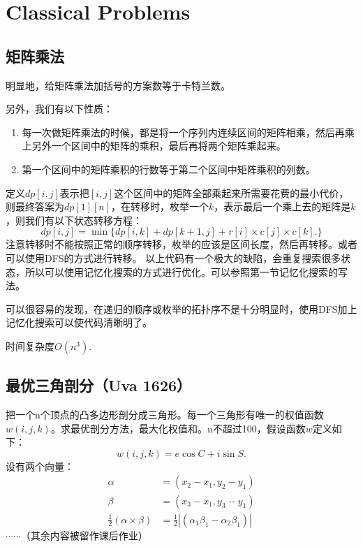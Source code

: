 \documentclass{article}
\begin{document}
\section{Classical Problems}
\subsection{矩阵乘法}
明显地，给矩阵乘法加括号的方案数等于卡特兰数。

另外，我们有以下性质：
\begin{enumerate}
    \item{每一次做矩阵乘法的时候，都是将一个序列内连续区间的矩阵相乘，然后再乘上另外一个区间中的矩阵的乘积，最后再将两个矩阵乘起来。}
    \item{第一个区间中的矩阵乘积的行数等于第二个区间中矩阵乘积的列数。}
\end{enumerate}

定义$dp[i,j]$表示把$[i,j]$这个区间中的矩阵全部乘起来所需要花费的最小代价，则最终答案为$dp[1][n]$，在转移时，枚举一个$k$，表示最后一个乘上去的矩阵是$k$，则我们有以下状态转移方程：
\begin{equation*}
    dp[i,j]=\min\{dp[i,k]+dp[k+1,j]+r[i]\times c[j]\times c[k].\}
\end{equation*}
注意转移时不能按照正常的顺序转移，枚举的应该是区间长度，然后再转移。或者可以使用DFS的方式进行转移。
以上代码有一个极大的缺陷，会重复搜索很多状态，所以可以使用记忆化搜索的方式进行优化。可以参照第一节记忆化搜索的写法。

可以很容易的发现，在递归的顺序或枚举的拓扑序不是十分明显时，使用DFS加上记忆化搜索可以使代码清晰明了。

时间复杂度$O(n^3)$.
\subsection{最优三角剖分（Uva 1626）}

把一个n个顶点的凸多边形剖分成三角形。每一个三角形有唯一的权值函数$w(i,j,k)$。求最优剖分方法，最大化权值和。n不超过100，假设函数$w$定义如下：
\begin{equation*}
    w(i,j,k)=e\cos C+i\sin S.
\end{equation*}
设有两个向量：
\begin{equation*}
    \begin{aligned}
        \alpha&=(x_2-x_1,y_2-y_1)\\
        \beta&=(x_3-x_1,y_3-y_1)\\
        \frac{1}{2}(\alpha\times\beta)&=\frac{1}{2}|(\alpha_1\beta_1-\alpha_2\beta_1)|
    \end{aligned}
\end{equation*}
$\cdots\cdots（其余内容被留作课后作业）$
\end{document}
